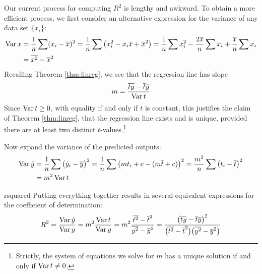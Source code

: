Our current process for computing $R^2$ is lengthy and awkward. To obtain a more efficient process, we first consider an alternative expression for the variance of any data set $\{x_i\}$:
\begin{align*}
	\operatorname{Var} x
	&=\frac 1n\sum(x_i-\overline{x})^2
	=\frac 1n\sum\left(x_i^2-x_i\overline{x}+\overline{x}^2\right)
	=\frac 1n\sum x_i^2-\frac{2\overline{x}}n\sum x_i+\frac{\overline{x}}n\sum x_i\\[2pt]
	&=\overline{x^2}-\overline{x}^2
\end{align*}
Recalling Theorem \ref{thm:linreg}, we see that the regression line has slope
\[
	m=\frac{\overline{ty}-\overline{t}\overline{y}}{\operatorname{Var} t}
\]
Since $\operatorname{Var} t\ge 0$, with equality if and only if $t$ is constant, this justifies the claim of Theorem \ref{thm:linreg}, that the regression line exists and is unique, provided there are at least two distinct $t$-values.\footnote{%
	Strictly, the system of equations we solve for $m$ has a unique solution if and only if $\operatorname{Var} t\neq 0$.%
}

Now expand the variance of the predicted outputs:
\begin{align*}
	\operatorname{Var}\hat y&
	=\frac 1n\sum\big(\hat y_i-\overline{y}\big)^2
	=\frac 1n\sum\big(mt_i+c-(m\overline{t}+c)\big)^2 
	=\frac{m^2}n\sum\big(t_i-\overline{t}\big)^2\\
	&=m^2\operatorname{Var} t
\end{align*}

\begin{thm}{}{rsquared}
Putting everything together results in several equivalent expressions for the coefficient of determination:
\[
	R^2 =\frac{\operatorname{Var}\hat y}{\operatorname{Var} y} 
	=m^2\frac{\operatorname{Var} t}{\operatorname{Var} y} 
	=m^2\frac{\overline{t^2}-\overline{t}^2}{\overline{y^2}-\overline{y}^2}
	=\frac{\big(\overline{ty}-\overline{t}\overline{y}\big)^2}{\big(\overline{t^2}-\overline{t}^2\big)\big(\overline{y^2}-\overline{y}^2\big)}
\]
\end{thm}


\pagebreak[3]


